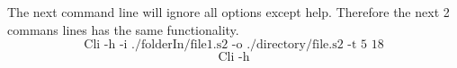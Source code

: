\documentclass[english]{article}
\begin{document}
The next command line will ignore all options except help. Therefore the next 2 commans lines has the same functionality.
$$\text{Cli -h -i ./folderIn/file1.s2 -o ./directory/file.s2 -t 5 18}$$
$$\text{Cli -h}$$





%
%
%
%
%
%
\end{document}
